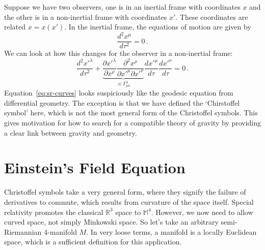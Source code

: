 Suppose we have two observers, one is in an inertial frame with coordinates $x$ and the other is in a non-inertial frame with coordinates $x'$. These coordinates are related $x = x(x')$. In the inertial frame, the equations of motion are given by 
\begin{equation}
    \frac{d^2x^\mu}{d\tau^2} = 0\,.
\end{equation} 
We can look at how this changes for the observer in a non-inertial frame:
\begin{equation}\label{eq:sr-curves}
    \frac{d^2x'^\lambda}{d\tau^2}+\underbrace{\frac{\partial x'^\lambda}{\partial x^\rho}\frac{\partial^2 x^\rho}{\partial x'^\mu \partial x'^\nu}}_{\equiv \Gamma_{\mu\nu}^\lambda} \frac{d x'^\mu}{d \tau} \frac{d x'^\nu}{d \tau} = 0\,.
\end{equation}
Equation~\ref{eq:sr-curves} looks suspiciously like the geodesic equation from differential geometry. The exception is that we have defined the `Chirstoffel symbol' here, which is not the most general form of the Christoffel symbols. This gives motivation for how to search for a compatible theory of gravity by providing a clear link between gravity and geometry. 
\section{Einstein's Field Equation}
Christoffel symbols take a very general form, where they signify the failure of derivatives to commute, which results from curvature of the space itself. Special relativity promotes the classical $\mathbb{R}^3$ space to $\mathbb{M}^4$. However, we now need to allow curved space, not simply Minkowski space. So let's take an arbitrary semi-Riemannian 4-manifold $M$. In very loose terms, a manifold is a locally Euclidean space, which is a sufficient definition for this application.

